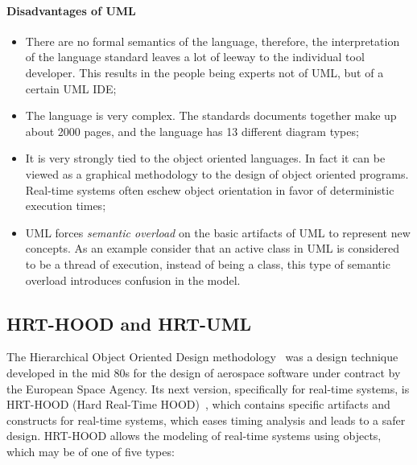 \paragraph{Disadvantages of UML}
\begin{itemize}
\item{There are no formal semantics of the language, therefore, the
  interpretation of the language standard leaves a lot of leeway to
  the individual tool developer. This results in the people being
  experts not of UML, but of a certain UML IDE;}
\item{The language is very complex. The standards documents together
  make up about 2000 pages, and the language has 13 different diagram
  types;}
\item{It is very strongly tied to the object oriented languages. In
  fact it can be viewed as a graphical methodology to the design of
  object oriented programs. Real-time systems often eschew object
  orientation in favor of deterministic execution times;}
\item{UML forces \emph{semantic overload} on the basic artifacts of
  UML to represent new concepts. As an example consider that an active
  class in UML is considered to be a thread of execution, instead of
  being a class, this type of semantic overload introduces confusion
  in the model.}
\end{itemize}

\subsection{HRT-HOOD and HRT-UML}
The Hierarchical Object Oriented Design
methodology~\cite{vielcanet@wadas89} was a design technique developed
in the mid 80s for the design of aerospace software under contract by
the European Space Agency. Its next version, specifically for
real-time systems, is HRT-HOOD (Hard Real-Time
HOOD)~\cite{burns@rts94}, which contains specific artifacts and
constructs for real-time systems, which eases timing analysis and
leads to a safer design. HRT-HOOD allows the modeling of real-time
systems using objects, which may be of one of five types:

